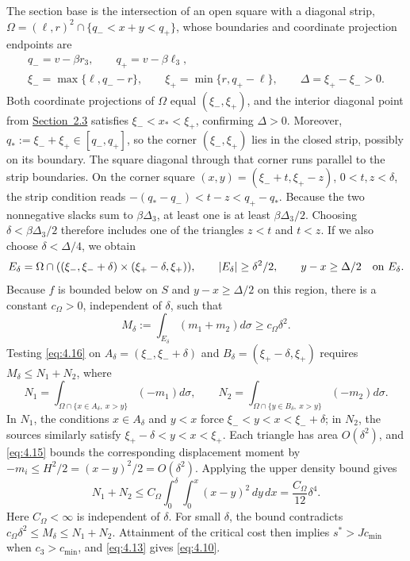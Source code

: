 \leavevmode{}\label{par:corner-geometry}
The section base is the intersection of an open square with a diagonal strip, \(\Omega=(\ell,r)^2\cap\{q_-<x+y<q_+\}\), whose boundaries and coordinate projection endpoints are
\[
\begin{gathered}
q_-=v-\beta r_3,\qquad q_+=v-\beta\ell_3,\\
\xi_-=\max\{\ell,q_--r\},\qquad
\xi_+=\min\{r,q_+-\ell\},\qquad \Delta=\xi_+-\xi_->0.
\end{gathered}
\]
Both coordinate projections of \(\Omega\) equal \((\xi_-,\xi_+)\), and the interior diagonal point from \mbox{\hyperref[geometry:interior-diagonal]{Section~2.3}} satisfies \(\xi_-<x_*<\xi_+\), confirming \(\Delta>0\). Moreover, \(q_*:=\xi_-+\xi_+\in[q_-,q_+]\), so the corner \((\xi_-,\xi_+)\) lies in the closed strip, possibly on its boundary. The square diagonal through that corner runs parallel to the strip boundaries. On the corner square \((x,y)=(\xi_-+t,\xi_+-z)\), \(0<t,z<\delta\), the strip condition reads \(-(q_*-q_-)<t-z<q_+-q_*\). Because the two nonnegative slacks sum to \(\beta\Delta_3\), at least one is at least \(\beta\Delta_3/2\). Choosing \(\delta<\beta\Delta_3/2\) therefore includes one of the triangles \(z<t\) and \(t<z\). If we also choose \(\delta<\Delta/4\), we obtain
\[
E_\delta=\Omega\cap((\xi_-,\xi_-+\delta)\times(\xi_+-\delta,\xi_+)),
\qquad |E_\delta|\ge\delta^2/2,
\qquad y-x\ge\Delta/2\quad\hbox{on }E_\delta.
\]
Because \(f\) is bounded below on \(S\) and \(y-x\ge\Delta/2\) on this region, there is a constant \(c_\Omega>0\), independent of \(\delta\), such that
\begin{equation}
M_\delta:=\int_{E_\delta}(m_1+m_2)d\sigma
\ge c_\Omega\delta^2.
\tag{4.17}\label{eq:4.17}
\end{equation}
Testing \eqref{eq:4.16} on \(A_\delta=(\xi_-,\xi_-+\delta)\) and \(B_\delta=(\xi_+-\delta,\xi_+)\) requires \(M_\delta\le N_1+N_2\), where
\[
N_1=\int_{\Omega\cap\{x\in A_\delta,\ x>y\}}(-m_1)d\sigma,
\qquad
N_2=\int_{\Omega\cap\{y\in B_\delta,\ x>y\}}(-m_2)d\sigma.
\]
In \(N_1\), the conditions \(x\in A_\delta\) and \(y<x\) force \(\xi_-<y<x<\xi_-+\delta\); in \(N_2\), the sources similarly satisfy \(\xi_+-\delta<y<x<\xi_+\). Each triangle has area \(O(\delta^2)\), and \eqref{eq:4.15} bounds the corresponding displacement moment by \(-m_i\le H^2/2=(x-y)^2/2=O(\delta^2)\). Applying the upper density bound gives
\begin{equation}
N_1+N_2\le C_\Omega\int_0^\delta\int_0^x(x-y)^2\,dy\,dx
=\frac{C_\Omega}{12}\delta^4.
\tag{4.18}\label{eq:4.18}
\end{equation}
Here \(C_\Omega<\infty\) is independent of \(\delta\). For small \(\delta\), the bound contradicts \(c_\Omega\delta^2\le M_\delta\le N_1+N_2\). Attainment of the critical cost then implies \(s^*>Jc_{\min}\) when \(c_3>c_{\min}\), and \eqref{eq:4.13} gives \eqref{eq:4.10}. \unskip\nobreak\hfill\proofbox

